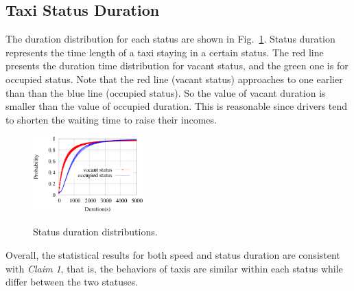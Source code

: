 \subsection{Taxi Status Duration}
The duration distribution for each status are shown in Fig.~\ref{figure_duration_for_each_status}. Status duration represents the time length of a taxi staying in a certain status. The red line presents the duration time distribution for vacant status, and the green one is for occupied status. Note that the red line (vacant status) approaches to  one earlier than than the blue line (occupied status). So the value of vacant duration is smaller than the value of occupied duration. This is reasonable since drivers tend to shorten the waiting time to raise their incomes.
\begin{figure}[!h]
\centering
\includegraphics[width=0.38\textwidth]{figures_201103/assumption/durationdis.eps}\\
\caption{Status duration distributions.}\label{figure_duration_for_each_status}
\end{figure}

Overall, the statistical results for both speed and status duration are consistent with \emph{Claim 1}, that is, the behaviors of taxis are similar within each status while differ between the two statuses.
